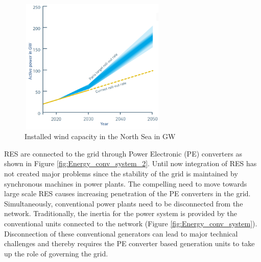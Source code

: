 \begin{figure}[H]
\centering
    \includegraphics[height = 6.5cm,width = 7cm]{Diagrams/Chapter_1/Paris_roll_out_2.png}
    \caption{Installed wind capacity in the North Sea in GW \cite{noauthor_vision_nodate}}
    \label{fig:Paris_roll_out}
\end{figure}

\gls{RES} are connected to the grid through Power Electronic (\gls{PE}) converters as shown in Figure \ref{fig:Energy_conv_system_2}. Until now integration of \gls{RES} has not created major problems since the stability of the grid is maintained by synchronous machines in power plants. The compelling need to move towards large scale \gls{RES} causes increasing penetration of the \gls{PE} converters in the grid. Simultaneously, conventional power plants need to be disconnected from the network. Traditionally, the inertia for the power system is provided by the conventional units connected to the network (Figure \ref{fig:Energy_conv_system}). Disconnection of these conventional generators can lead to major technical challenges and thereby requires the \gls{PE} converter based generation units to take up the role of governing the grid.

